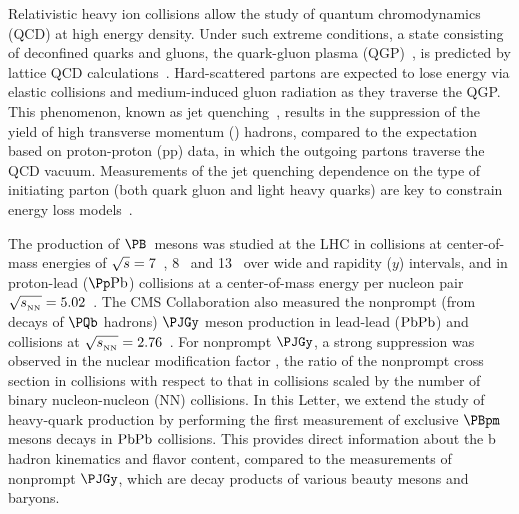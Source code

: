 
\maketitle
Relativistic heavy ion collisions allow the study of quantum chromodynamics (QCD) at high energy density.
Under such extreme conditions, a state consisting of deconfined quarks and gluons, the quark-gluon plasma (QGP)~\cite{QGP1,QGP2}, is predicted by lattice QCD calculations~\cite{Karsch:2003jg}.
Hard-scattered partons are expected to lose energy via elastic collisions and medium-induced gluon radiation as they traverse the QGP. This phenomenon, known as jet quenching~\cite{Eloss1,Baier:2000mf,Chatrchyan:2011sx,Aad:2010bu}, results in the suppression of the yield of high transverse momentum (\pt) hadrons, compared to the  expectation based on proton-proton (pp) data, in which the outgoing partons traverse the QCD vacuum. Measurements of the jet quenching dependence on the type of initiating parton (both quark \vs gluon and light \vs heavy quarks) are key to constrain energy loss models~\cite{Dokshitzer:2001zm,Armesto:2003jh,Wicks:2007am,Zhang:2003wk,Adil:2006ra}.

The production of $\PB$~mesons was studied at the LHC in \pp collisions at center-of-mass energies of $\sqrt{s} = 7$\TeV~\cite{CMSBmesonpp,Chatrchyan:2011pw,Chatrchyan:2011vh,ATLAS:2013cia,LHCb:2013JHEP,Aaij:2014hla,Aaij:2012dd}, 8\TeV~\cite{Aaij:2015fea,Aaij:2014ija} and 13\TeV~\cite{Khachatryan:2016csy} over wide \pt and rapidity ($y$) intervals, and in proton-lead ($\pPb$) collisions at a center-of-mass energy per nucleon pair $\sqrtsNN = 5.02$\TeV~\cite{Khachatryan:2015uja}.
The CMS Collaboration also measured the nonprompt (\ie from decays of $\PQb$ hadrons) $\PJGy$ meson production in lead-lead ($\mathrm{PbPb}$) and \pp collisions at $\sqrtsNN = 2.76$\TeV~\cite{CMSNonPromptJpsi}. For nonprompt $\PJGy$, a strong suppression was observed in the nuclear modification factor \RAA, the ratio of the nonprompt \PJGy cross section in \PbPb collisions with respect to that in \pp collisions scaled by the number of binary nucleon-nucleon (NN) collisions. In this Letter, we extend the study of heavy-quark production by performing the first measurement of exclusive $\PBpm$ mesons decays in $\mathrm{PbPb}$ collisions. This provides direct information about the b hadron kinematics and flavor content, compared to the measurements of nonprompt $\PJGy$, which are decay products of various beauty mesons and baryons.

